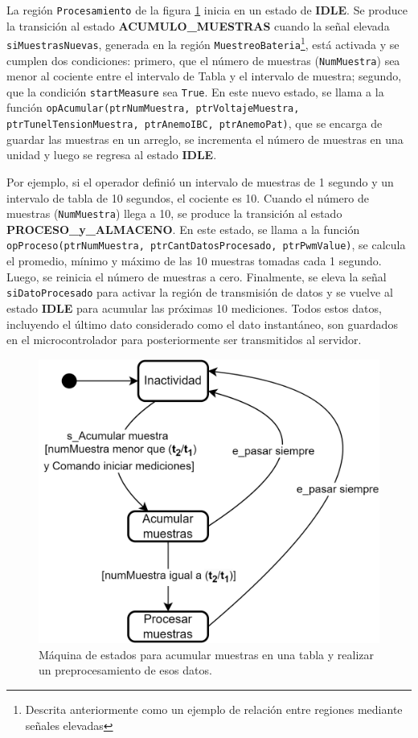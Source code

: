 La región \texttt{Procesamiento} de la figura \ref{fig:AcumularProcesarMuestras} inicia en un estado de \textbf{IDLE}. Se produce la transición al estado \textbf{ACUMULO\_MUESTRAS} cuando la señal elevada \texttt{siMuestrasNuevas}, generada en la región \texttt{MuestreoBateria}\footnote{Descrita anteriormente como un ejemplo de relación entre regiones mediante señales elevadas}, está activada y se cumplen dos condiciones: primero, que el número de muestras (\texttt{NumMuestra}) sea menor al cociente entre el intervalo de Tabla y el intervalo de muestra; segundo, que la condición \texttt{startMeasure} sea \texttt{True}. En este nuevo estado, se llama a la función \texttt{opAcumular(ptrNumMuestra, ptrVoltajeMuestra, ptrTunelTensionMuestra, ptrAnemoIBC, ptrAnemoPat)}, que se encarga de guardar las muestras en un arreglo, se incrementa el número de muestras en una unidad y luego se regresa al estado \textbf{IDLE}.

Por ejemplo, si el operador definió un intervalo de muestras de 1 segundo y un intervalo de tabla de 10 segundos, el cociente es 10. Cuando el número de muestras (\texttt{NumMuestra}) llega a 10, se produce la transición al estado \textbf{PROCESO\_y\_ALMACENO}. En este estado, se llama a la función \texttt{opProceso(ptrNumMuestra, ptrCantDatosProcesado, ptrPwmValue)}, se calcula el promedio, mínimo y máximo de las 10 muestras tomadas cada 1 segundo. Luego, se reinicia el número de muestras a cero. Finalmente, se eleva la señal \texttt{siDatoProcesado} para activar la región de transmisión de datos y se vuelve al estado \textbf{IDLE} para acumular las próximas 10 mediciones. Todos estos datos, incluyendo el último dato considerado como el dato instantáneo, son guardados en el microcontrolador para posteriormente ser transmitidos al servidor.


\begin{figure}[H]
    \centering
    \includegraphics[width=0.6\linewidth]{Figuras/datalogger/Firmware/sc_processing.png}
    \caption{Máquina de estados para acumular muestras en una tabla y realizar un preprocesamiento de esos datos.}
    \label{fig:AcumularProcesarMuestras}
\end{figure}

